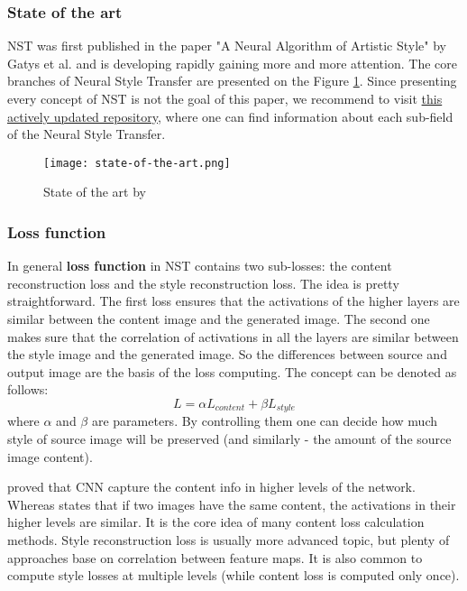 \documentclass[../Main.tex]{subfiles}
\begin{document}
    \subsubsection{State of the art}
    NST was first published in the paper "A Neural Algorithm of Artistic Style" by Gatys et al. \cite{gatys2015neural} and is developing rapidly gaining more and more attention. The core branches of Neural Style Transfer are presented on the Figure \ref{fig:state-of-the-art}. Since presenting every concept of NST is not the goal of this paper, we recommend to visit \href{https://github.com/ycjing/Neural-Style-Transfer-Papers}{this actively updated repository}, where one can find information about each sub-field of the Neural Style Transfer. \\
    \begin{figure}[h!]
        \centering
        \texttt{[image: state-of-the-art.png]}
        \caption{State of the art by \cite{nstpapersrepo}}
        \label{fig:state-of-the-art}
    \end{figure}
    
    \subsubsection{Loss function}
    In general \textbf{loss function} in NST contains two sub-losses: the content reconstruction loss and the style reconstruction loss. The idea is pretty straightforward. The first loss ensures that the activations of the higher layers are similar between the content image and the generated image. The second one makes sure that the correlation of activations in all the layers are similar between the style image and the generated image. So the differences between source and output image are the basis of the loss computing.
    The concept can be denoted as follows:
    \[L= \alpha L_{content} + \beta L_{style}\]
    where $\alpha$ and $\beta$ are parameters. By controlling them one can decide how much style of source image will be preserved (and similarly - the amount of the source image content). 
    
    \cite{gatys2015neural} proved that CNN capture the content info in higher levels of the network. Whereas \cite{zeiler2013visualizing} states that if two images have the same content, the activations in their higher levels are similar. It is the core idea of many content loss calculation methods.
    Style reconstruction loss is usually more advanced topic, but plenty of approaches base on correlation between feature maps. It is also common to compute style losses at multiple levels (while content loss is computed only once).
\end{document}
